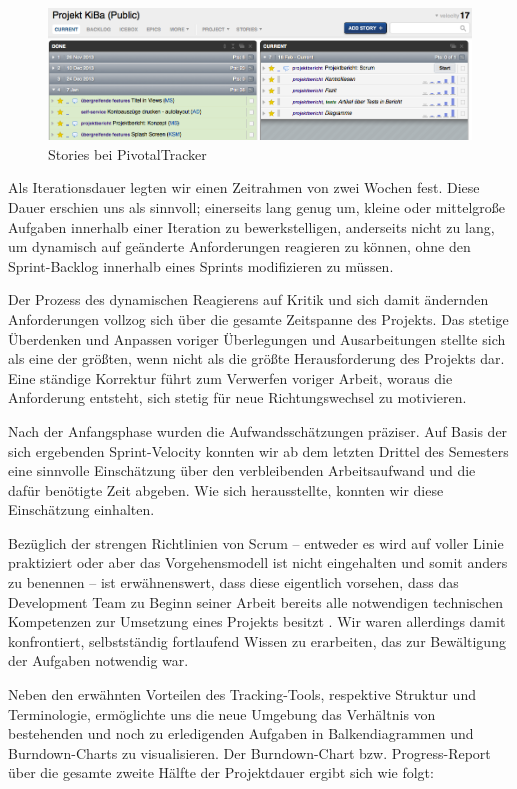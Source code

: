\begin{figure}[h]
	\centering
	\includegraphics[scale=.25]{Pictures/pivottracker-overview}
	\caption{Stories bei PivotalTracker\label{fig:Pivottracker}}
\end{figure}

	Als Iterationsdauer legten wir einen Zeitrahmen von zwei Wochen fest. Diese Dauer erschien uns als sinnvoll; einerseits lang genug um, kleine oder mittelgroße Aufgaben innerhalb einer Iteration zu bewerkstelligen, anderseits nicht zu lang, um dynamisch auf geänderte Anforderungen reagieren zu können, ohne den Sprint-Backlog innerhalb eines Sprints modifizieren zu müssen. 
	
	Der Prozess des dynamischen Reagierens auf Kritik und sich damit ändernden Anforderungen vollzog sich über die gesamte Zeitspanne des Projekts. Das stetige Überdenken und Anpassen voriger Überlegungen und Ausarbeitungen stellte sich als eine der größten, wenn nicht als die größte Herausforderung des Projekts dar. Eine ständige Korrektur führt zum Verwerfen voriger Arbeit, woraus die Anforderung entsteht, sich stetig für neue Richtungswechsel zu motivieren.  

	Nach der Anfangsphase wurden die Aufwandsschätzungen präziser. Auf Basis der sich ergebenden Sprint-Velocity konnten wir ab dem letzten Drittel des Semesters eine sinnvolle Einschätzung über den verbleibenden Arbeitsaufwand und die dafür benötigte Zeit abgeben. Wie sich herausstellte, konnten wir diese Einschätzung einhalten. 

	Bezüglich der strengen Richtlinien von Scrum – entweder es wird auf voller Linie praktiziert oder aber das Vorgehensmodell ist nicht eingehalten und somit anders zu benennen – ist erwähnenswert, dass diese eigentlich vorsehen, dass das Development Team zu Beginn seiner Arbeit bereits alle notwendigen technischen Kompetenzen zur Umsetzung eines Projekts besitzt \citep{ScrumGuideFull12}. Wir waren allerdings damit konfrontiert, selbstständig fortlaufend Wissen zu erarbeiten, das zur Bewältigung der Aufgaben notwendig war.

	 Neben den erwähnten Vorteilen des Tracking-Tools, respektive Struktur und Terminologie, ermöglichte uns die neue Umgebung das Verhältnis von bestehenden und noch zu erledigenden Aufgaben in Balkendiagrammen und Burndown-Charts zu visualisieren. Der Burndown-Chart bzw. Progress-Report über die gesamte zweite Hälfte der Projektdauer ergibt sich wie folgt:
	 
